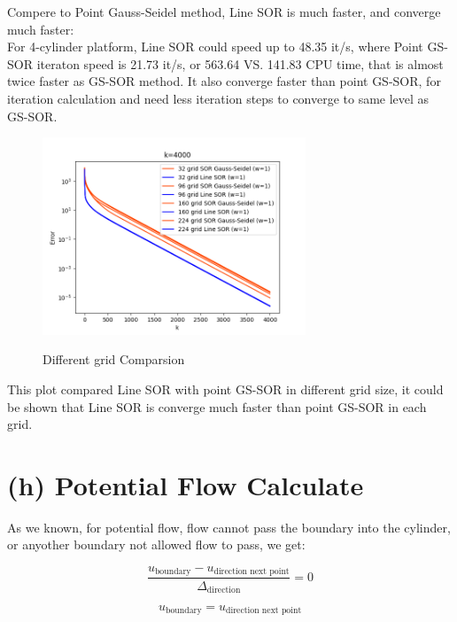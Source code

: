 \documentclass[12pt]{article}
\begin{document}
Compere to Point Gauss-Seidel method, Line SOR is much faster, and converge much faster:\\

For 4-cylinder platform, Line SOR could speed up to 48.35 it/s,
where Point GS-SOR iteraton speed is 21.73 it/s, or 563.64 VS. 141.83 CPU time,
that is almost twice faster as 
GS-SOR method. It also converge faster than point GS-SOR, 
for iteration calculation and need less iteration steps to converge to same level as 
GS-SOR.

\begin{figure}[H]
    \centering
    \includegraphics[width=0.7\textwidth]{LineVSpointTotal.png}
    \label{LineVSpointTotal.png}
    \caption{Different grid Comparsion}
\end{figure}

This plot compared Line SOR with point GS-SOR in different grid size, it could be shown
that Line SOR is converge much faster than point GS-SOR in each grid.










\section{(h) Potential Flow Calculate}



As we known, for potential flow, flow cannot pass the boundary into the cylinder, or 
anyother boundary not allowed flow to pass, we get:



\[
\frac{u_{\text{boundary}} - u_{\text{direction next point}}}{\Delta_{\text{direction}}} = 0
\]

\[
u_{\text{boundary}} = u_{\text{direction next point}}
\]
\end{document}
